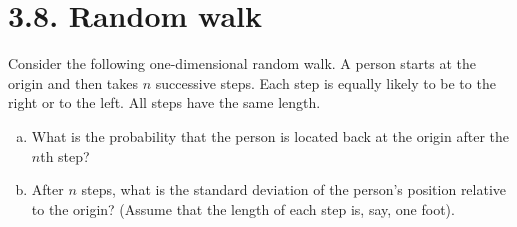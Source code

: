 \section*{3.8. Random walk}
Consider the following one-dimensional random walk. A person starts at the origin and
then takes $n$ successive steps. Each step is equally likely to be to the right or to the
left. All steps have the same length.
\begin{enumerate}[(a)]
    \item What is the probability that the person is located back at the 
        origin after the $n$th step?

    \item After $n$ steps, what is the standard deviation of the person's position
        relative to the origin? (Assume that the length of each step is, say, one 
        foot).
\end{enumerate}

\vspace{1em}

